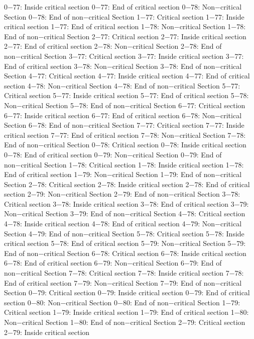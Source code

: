 0−77: Inside critical section
0−77: End of critical section
0−78: Non−critical Section
0−78: End of non−critical Section
1−77: Critical section
1−77: Inside critical section
1−77: End of critical section
1−78: Non−critical Section
1−78: End of non−critical Section
2−77: Critical section
2−77: Inside critical section
2−77: End of critical section
2−78: Non−critical Section
2−78: End of non−critical Section
3−77: Critical section
3−77: Inside critical section
3−77: End of critical section
3−78: Non−critical Section
3−78: End of non−critical Section
4−77: Critical section
4−77: Inside critical section
4−77: End of critical section
4−78: Non−critical Section
4−78: End of non−critical Section
5−77: Critical section
5−77: Inside critical section
5−77: End of critical section
5−78: Non−critical Section
5−78: End of non−critical Section
6−77: Critical section
6−77: Inside critical section
6−77: End of critical section
6−78: Non−critical Section
6−78: End of non−critical Section
7−77: Critical section
7−77: Inside critical section
7−77: End of critical section
7−78: Non−critical Section
7−78: End of non−critical Section
0−78: Critical section
0−78: Inside critical section
0−78: End of critical section
0−79: Non−critical Section
0−79: End of non−critical Section
1−78: Critical section
1−78: Inside critical section
1−78: End of critical section
1−79: Non−critical Section
1−79: End of non−critical Section
2−78: Critical section
2−78: Inside critical section
2−78: End of critical section
2−79: Non−critical Section
2−79: End of non−critical Section
3−78: Critical section
3−78: Inside critical section
3−78: End of critical section
3−79: Non−critical Section
3−79: End of non−critical Section
4−78: Critical section
4−78: Inside critical section
4−78: End of critical section
4−79: Non−critical Section
4−79: End of non−critical Section
5−78: Critical section
5−78: Inside critical section
5−78: End of critical section
5−79: Non−critical Section
5−79: End of non−critical Section
6−78: Critical section
6−78: Inside critical section
6−78: End of critical section
6−79: Non−critical Section
6−79: End of non−critical Section
7−78: Critical section
7−78: Inside critical section
7−78: End of critical section
7−79: Non−critical Section
7−79: End of non−critical Section
0−79: Critical section
0−79: Inside critical section
0−79: End of critical section
0−80: Non−critical Section
0−80: End of non−critical Section
1−79: Critical section
1−79: Inside critical section
1−79: End of critical section
1−80: Non−critical Section
1−80: End of non−critical Section
2−79: Critical section
2−79: Inside critical section
